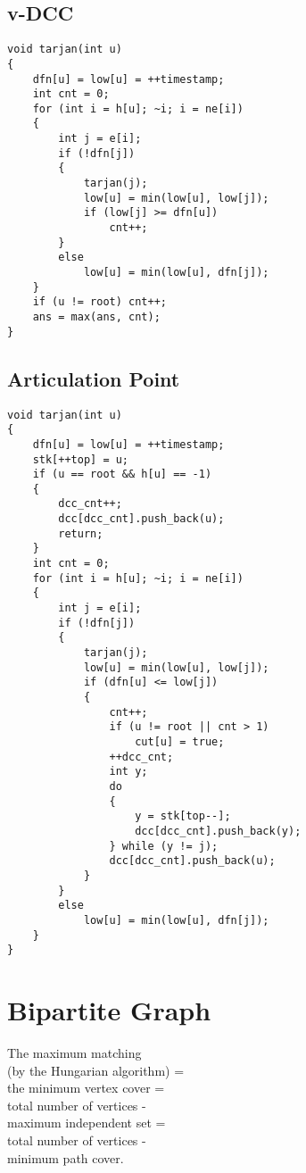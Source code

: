 \subsection{v-DCC}
\begin{lstlisting}
void tarjan(int u)
{
    dfn[u] = low[u] = ++timestamp;
    int cnt = 0;
    for (int i = h[u]; ~i; i = ne[i])
    {
        int j = e[i];
        if (!dfn[j])
        {
            tarjan(j);
            low[u] = min(low[u], low[j]);
            if (low[j] >= dfn[u])
                cnt++;
        }
        else
            low[u] = min(low[u], dfn[j]);
    }
    if (u != root) cnt++;
    ans = max(ans, cnt);
}
\end{lstlisting}
\subsection{Articulation Point}
\begin{lstlisting}
void tarjan(int u)
{
    dfn[u] = low[u] = ++timestamp;
    stk[++top] = u;
    if (u == root && h[u] == -1)
    {
        dcc_cnt++;
        dcc[dcc_cnt].push_back(u);
        return;
    }
    int cnt = 0;
    for (int i = h[u]; ~i; i = ne[i])
    {
        int j = e[i];
        if (!dfn[j])
        {
            tarjan(j);
            low[u] = min(low[u], low[j]);
            if (dfn[u] <= low[j])
            {
                cnt++;
                if (u != root || cnt > 1)
                    cut[u] = true;
                ++dcc_cnt;
                int y;
                do
                {
                    y = stk[top--];
                    dcc[dcc_cnt].push_back(y);
                } while (y != j);
                dcc[dcc_cnt].push_back(u);
            }
        }
        else
            low[u] = min(low[u], dfn[j]);
    }
}
\end{lstlisting}
\section{Bipartite Graph}
The maximum matching \\
(by the Hungarian algorithm) = \\
the minimum vertex cover = \\
total number of vertices - \\
maximum independent set = \\
total number of vertices - \\
minimum path cover.
